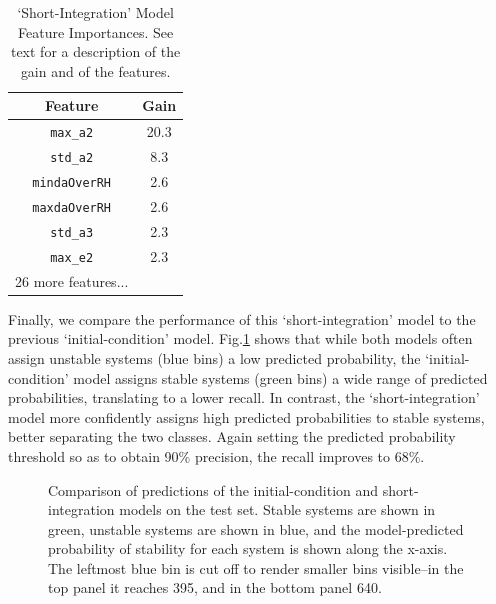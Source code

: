 \begin{table}[h]
\begin{center}
\caption{`Short-Integration' Model Feature Importances. See text for a description of the gain and of the features. \label{features}}
\begin{tabular}{ c|c }
Feature & Gain \\
  \hline \hline			
  {\tt max\_a2} & 20.3 \\
  {\tt std\_a2} & 8.3 \\
  {\tt mindaOverRH} & 2.6 \\
  {\tt maxdaOverRH} & 2.6 \\
  {\tt std\_a3} & 2.3 \\
  {\tt max\_e2} & 2.3 \\
  26 more features... & \\
  \hline  
\end{tabular}
\end{center}
\end{table}

Finally, we compare the performance of this `short-integration' model to the previous `initial-condition' model.
Fig.\:\ref{dianaplot} shows that while both models often assign unstable systems (blue bins) a low predicted probability, the `initial-condition' model assigns stable systems (green bins) a wide range of predicted probabilities, translating to a lower recall.
In contrast, the `short-integration' model more confidently assigns high predicted probabilities to stable systems, better separating the two classes.
Again setting the predicted probability threshold so as to obtain 90\% precision, the recall improves to 68\%.

\begin{figure}
 \centering {}
 \caption{
     Comparison of predictions of the initial-condition and short-integration models on the test set.
     Stable systems are shown in green, unstable systems are shown in blue, and the model-predicted probability of stability for each system is shown along the x-axis.
     The leftmost blue bin is cut off to render smaller bins visible--in the top panel it reaches 395, and in the bottom panel 640.
    \label{dianaplot}}
\end{figure}

